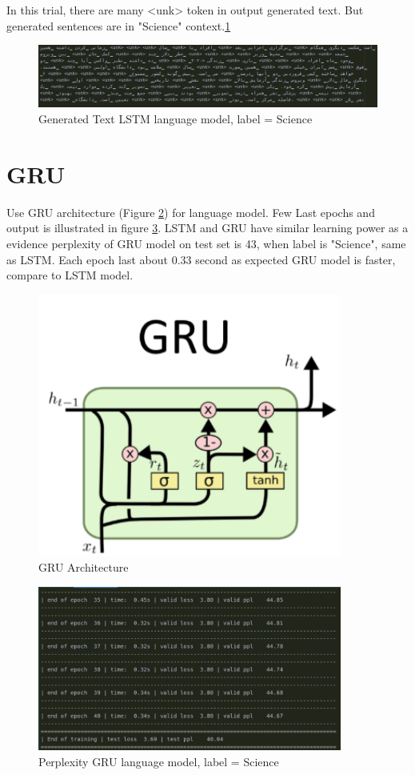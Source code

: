 In this trial, there are many <unk> token in output generated text. But generated sentences are in "Science" context.\ref{fig:gru_education_out}
\begin{figure}
	\centering
	\includegraphics[width=15cm]{images/lstm_danesh_out.png}
	\caption{Generated Text LSTM language model, label = Science}
	\label{fig:gru_education_out}
\end{figure}

\section{GRU}

Use GRU architecture (Figure \ref{fig:mygru}) for language model. Few Last epochs and output is illustrated in figure \ref{fig:gru_education}. LSTM and GRU have similar learning power as a evidence perplexity of GRU model on test set is 43, when label is "Science", same as LSTM. Each epoch last about 0.33 second as expected GRU model is faster, compare to LSTM model. 


\begin{figure}
	\centering
	\includegraphics[width=10cm]{images/gru.png}
	\caption{GRU Architecture}
	\label{fig:mygru}
	
\end{figure}

\begin{figure}
	\centering
	\includegraphics[width=10cm]{images/gru_danesh.png}
	\caption{Perplexity GRU language model, label = Science}
	\label{fig:gru_education}
\end{figure}

